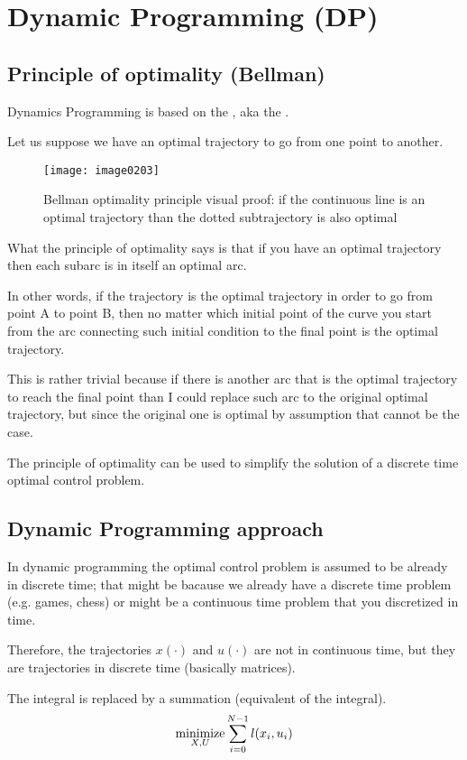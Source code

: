 \section{Dynamic Programming (DP)}
\subsection{Principle of optimality (Bellman)}
Dynamics Programming is based on the , aka the .

Let us suppose we have an optimal trajectory to go from one point to another. 
\begin{figure}[!h]
\centering
\texttt{[image: image0203]}
\caption{Bellman optimality principle visual proof: if the continuous line is an optimal trajectory than the dotted subtrajectory is also optimal}
\end{figure}

What the principle of optimality says is that if you have an optimal trajectory then each subarc is in itself an optimal arc.

In other words, if the trajectory is the optimal trajectory in order to go from point A to point B, then no matter which initial point of the curve you start from the arc connecting such initial condition to the final point is the optimal trajectory.

This is rather trivial because if there is another arc that is the optimal trajectory to reach the final point than I could replace such arc to the original optimal trajectory, but since the original one is optimal by assumption that cannot be the case.

The principle of optimality can be used to simplify the solution of a discrete time optimal control problem.
\subsection{Dynamic Programming approach}

In dynamic programming the optimal control problem is assumed to be already in discrete time; that might be bacause we already have a discrete time problem (e.g. games, chess) or might be a continuous time problem that you discretized in time.

Therefore, the trajectories $x(\cdot)$ and $u(\cdot)$ are not in continuous time, but they are trajectories in discrete time (basically matrices).

The integral is replaced by a summation (equivalent of the integral).
\[\operatorname*{minimize}_{X, U} \sum_{i=0}^{N-1} l(x_i, u_i)\]

